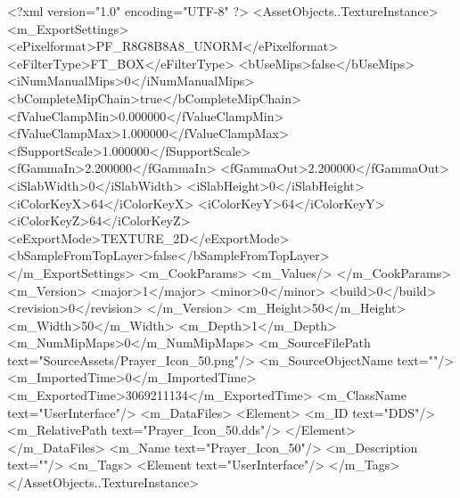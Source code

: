 <?xml version="1.0" encoding="UTF-8" ?>
<AssetObjects..TextureInstance>
	<m_ExportSettings>
		<ePixelformat>PF_R8G8B8A8_UNORM</ePixelformat>
		<eFilterType>FT_BOX</eFilterType>
		<bUseMips>false</bUseMips>
		<iNumManualMips>0</iNumManualMips>
		<bCompleteMipChain>true</bCompleteMipChain>
		<fValueClampMin>0.000000</fValueClampMin>
		<fValueClampMax>1.000000</fValueClampMax>
		<fSupportScale>1.000000</fSupportScale>
		<fGammaIn>2.200000</fGammaIn>
		<fGammaOut>2.200000</fGammaOut>
		<iSlabWidth>0</iSlabWidth>
		<iSlabHeight>0</iSlabHeight>
		<iColorKeyX>64</iColorKeyX>
		<iColorKeyY>64</iColorKeyY>
		<iColorKeyZ>64</iColorKeyZ>
		<eExportMode>TEXTURE_2D</eExportMode>
		<bSampleFromTopLayer>false</bSampleFromTopLayer>
	</m_ExportSettings>
	<m_CookParams>
		<m_Values/>
	</m_CookParams>
	<m_Version>
		<major>1</major>
		<minor>0</minor>
		<build>0</build>
		<revision>0</revision>
	</m_Version>
	<m_Height>50</m_Height>
	<m_Width>50</m_Width>
	<m_Depth>1</m_Depth>
	<m_NumMipMaps>0</m_NumMipMaps>
	<m_SourceFilePath text="SourceAssets/Prayer_Icon_50.png"/>
	<m_SourceObjectName text=""/>
	<m_ImportedTime>0</m_ImportedTime>
	<m_ExportedTime>3069211134</m_ExportedTime>
	<m_ClassName text="UserInterface"/>
	<m_DataFiles>
		<Element>
			<m_ID text="DDS"/>
			<m_RelativePath text="Prayer_Icon_50.dds"/>
		</Element>
	</m_DataFiles>
	<m_Name text="Prayer_Icon_50"/>
	<m_Description text=""/>
	<m_Tags>
		<Element text="UserInterface"/>
	</m_Tags>
</AssetObjects..TextureInstance>
